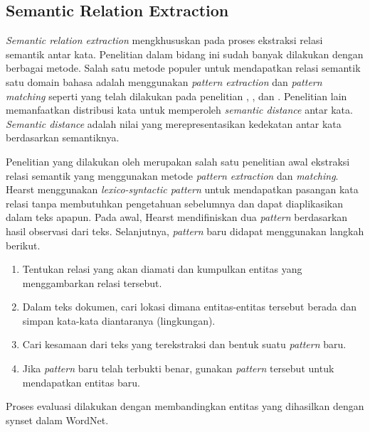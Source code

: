 \subsection{Semantic Relation Extraction}
\textit{Semantic relation extraction} mengkhususkan pada proses ekstraksi relasi semantik antar kata. Penelitian dalam bidang ini sudah banyak dilakukan dengan berbagai metode. Salah satu metode populer untuk mendapatkan relasi semantik satu domain bahasa adalah menggunakan \textit{pattern extraction} dan \textit{pattern matching} seperti yang telah dilakukan pada penelitian \cite{hearst1992automatic}, \cite{ruiz2005automatic}, dan \cite{arnold2014extracting}. Penelitian lain memanfaatkan distribusi kata untuk memperoleh \textit{semantic distance} antar kata. \textit{Semantic distance} adalah nilai yang merepresentasikan kedekatan antar kata berdasarkan semantiknya.

Penelitian yang dilakukan oleh \cite{hearst1992automatic} merupakan salah satu penelitian awal ekstraksi relasi semantik yang menggunakan metode \textit{pattern extraction} dan \textit{matching}. Hearst menggunakan \textit{lexico-syntactic pattern} untuk mendapatkan pasangan kata relasi tanpa membutuhkan pengetahuan sebelumnya dan dapat diaplikasikan dalam teks apapun. Pada awal, Hearst mendifiniskan dua \textit{pattern} berdasarkan hasil observasi dari teks. Selanjutnya, \textit{pattern} baru didapat menggunakan langkah berikut. 
\begin{enumerate}
  \item Tentukan relasi yang akan diamati dan kumpulkan entitas yang menggambarkan relasi tersebut.
  \item Dalam teks dokumen, cari lokasi dimana entitas-entitas tersebut berada dan simpan kata-kata diantaranya (lingkungan).
  \item Cari kesamaan dari teks yang terekstraksi dan bentuk suatu \textit{pattern} baru.
  \item Jika \textit{pattern} baru telah terbukti benar, gunakan \textit{pattern} tersebut untuk mendapatkan entitas baru.
\end{enumerate}
Proses evaluasi dilakukan dengan membandingkan entitas yang dihasilkan dengan synset dalam WordNet. 

